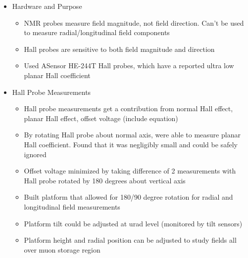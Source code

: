 \begin{itemize}
    \item Hardware and Purpose
        \begin{itemize}
            \item NMR probes measure field magnitude, not field direction. Can't be used to measure radial/longitudinal field components
            \item Hall probes are sensitive to both field magnitude and direction
            \item Used ASensor HE-244T Hall probes, which have a reported ultra low planar Hall coefficient
        \end{itemize}
    \item Hall Probe Measurements
        \begin{itemize}
            \item Hall probe measurements get a contribution from normal Hall effect, planar Hall effect, offset voltage (include equation)
            \item By rotating Hall probe about normal axis, were able to measure planar Hall coefficient. Found that it was negligibly small and could be safely ignored 
            \item Offset voltage minimized by taking difference of 2 measurements with Hall probe rotated by 180 degrees about vertical axis
            \item Built platform that allowed for 180/90 degree rotation for radial and longitudinal field measurements
            \item Platform tilt could be adjusted at urad level (monitored by tilt sensors)
            \item Platform height and radial position can be adjusted to study fields all over muon storage region
        \end{itemize}
\end{itemize}
